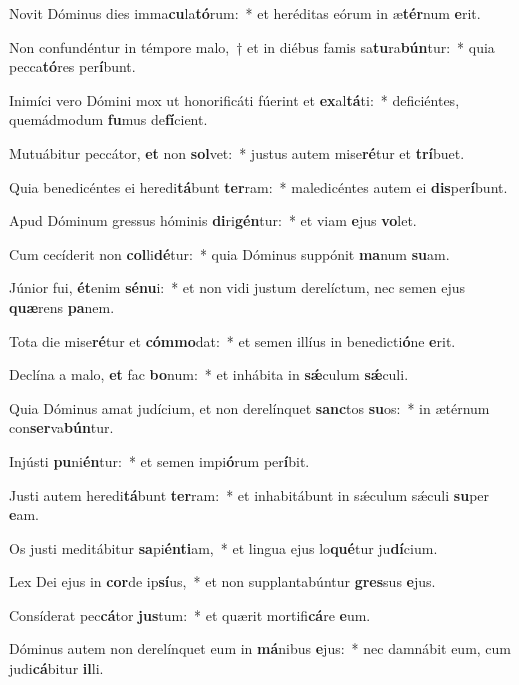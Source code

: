 \item Novit Dóminus dies imma\textbf{cu}la\textbf{tó}rum:~* et heréditas eórum in æ\textbf{tér}num \textbf{e}rit.
\item Non confundéntur in témpore malo,~† et in diébus famis sa\textbf{tu}ra\textbf{bún}tur:~* quia pecca\textbf{tó}res per\textbf{í}bunt.
\item Inimíci vero Dómini mox ut honorificáti fúerint et \textbf{ex}al\textbf{tá}ti:~* deficiéntes, quemádmodum \textbf{fu}mus de\textbf{fí}cient.
\item Mutuábitur peccátor, \textbf{et} non \textbf{sol}vet:~* justus autem mise\textbf{ré}tur et \textbf{trí}buet.
\item Quia benedicéntes ei heredi\textbf{tá}bunt \textbf{ter}ram:~* maledicéntes autem ei \textbf{dis}per\textbf{í}bunt.
\item Apud Dóminum gressus hóminis \textbf{di}ri\textbf{gén}tur:~* et viam \textbf{e}jus \textbf{vo}let.
\item Cum cecíderit non \textbf{col}li\textbf{dé}tur:~* quia Dóminus suppónit \textbf{ma}num \textbf{su}am.
\item Júnior fui, \textbf{ét}enim \textbf{sé}\textbf{nu}i:~* et non vidi justum derelíctum, nec semen ejus \textbf{quæ}rens \textbf{pa}nem.
\item Tota die mise\textbf{ré}tur et \textbf{cóm}\textbf{mo}dat:~* et semen illíus in benedicti\textbf{ó}ne \textbf{e}rit.
\item Declína a malo, \textbf{et} fac \textbf{bo}num:~* et inhábita in \textbf{sǽ}culum \textbf{sǽ}culi.
\item Quia Dóminus amat judícium, et non derelínquet \textbf{sanc}tos \textbf{su}os:~* in ætérnum con\textbf{ser}va\textbf{bún}tur.
\item Injústi \textbf{pu}ni\textbf{én}tur:~* et semen impi\textbf{ó}rum per\textbf{í}bit.
\item Justi autem heredi\textbf{tá}bunt \textbf{ter}ram:~* et inhabitábunt in sǽculum sǽculi \textbf{su}per \textbf{e}am.
\item Os justi meditábitur \textbf{sa}pi\textbf{én}\textbf{ti}am,~* et lingua ejus lo\textbf{qué}tur ju\textbf{dí}cium.
\item Lex Dei ejus in \textbf{cor}de ip\textbf{sí}us,~* et non supplantabúntur \textbf{gres}sus \textbf{e}jus.
\item Consíderat pec\textbf{cá}tor \textbf{jus}tum:~* et quærit mortifi\textbf{cá}re \textbf{e}um.
\item Dóminus autem non derelínquet eum in \textbf{má}nibus \textbf{e}jus:~* nec damnábit eum, cum judi\textbf{cá}bitur \textbf{il}li.
